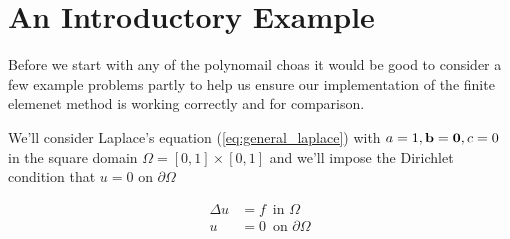 \chapter{An Introductory Example}

Before we start with any of the polynomail choas it would be good to consider a
few example problems partly to help us ensure our implementation of the finite
elemenet method is working correctly and for comparison.

We'll consider Laplace's equation (\ref{eq:general_laplace}) with $a = 1, \mathbf{b}
= \mathbf{0}, c = 0$ in the square domain $\Omega = [0, 1] \times [0, 1]$ and we'll
impose the Dirichlet condition that $u = 0$ on $\partial\Omega$

\begin{center}
\end{center}

\begin{align*}
    \Delta u &= f\, \text{ in $\Omega$} \\
           u &= 0\, \text{ on $\partial\Omega$}
\end{align*}
